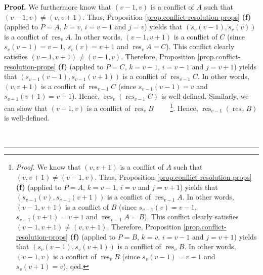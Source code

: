 \documentclass[numbers=enddot,12pt,final,onecolumn,notitlepage]{scrartcl}%
\theoremstyle{definition}
\newenvironment{proof}[1][Proof]{\noindent\textbf{#1.} }{\ \rule{0.5em}{0.5em}}
\newenvironment{verlong}{}{}
\begin{document}
\begin{verlong}
\begin{proof}
We furthermore know that $\left(  v-1,v\right)  $ is a conflict of $A$ such
that $\left(  v-1,v\right)  \neq\left(  v,v+1\right)  $. Thus, Proposition
\ref{prop.conflict-resolution-props} \textbf{(f)} (applied to $P=A$, $k=v$,
$i=v-1$ and $j=v$) yields that $\left(  s_{v}\left(  v-1\right)  ,s_{v}\left(
v\right)  \right)  $ is a conflict of $\operatorname*{res}\nolimits_{v}A$. In
other words, $\left(  v-1,v+1\right)  $ is a conflict of $C$ (since
$s_{v}\left(  v-1\right)  =v-1$, $s_{v}\left(  v\right)  =v+1$ and
$\operatorname*{res}\nolimits_{v}A=C$). This conflict clearly satisfies
$\left(  v-1,v+1\right)  \neq\left(  v-1,v\right)  $. Therefore, Proposition
\ref{prop.conflict-resolution-props} \textbf{(f)} (applied to $P=C$, $k=v-1$,
$i=v-1$ and $j=v+1$) yields that $\left(  s_{v-1}\left(  v-1\right)
,s_{v-1}\left(  v+1\right)  \right)  $ is a conflict of $\operatorname*{res}%
\nolimits_{v-1}C$. In other words, $\left(  v,v+1\right)  $ is a conflict of
$\operatorname*{res}\nolimits_{v-1}C$ (since $s_{v-1}\left(  v-1\right)  =v$
and $s_{v-1}\left(  v+1\right)  =v+1$). Hence, $\operatorname*{res}%
\nolimits_{v}\left(  \operatorname*{res}\nolimits_{v-1}C\right)  $ is
well-defined. Similarly, we can show that $\left(  v-1,v\right)  $ is a
conflict of $\operatorname*{res}\nolimits_{v}B$%
\ \ \ \ \footnote{\textit{Proof.} We know that $\left(  v,v+1\right)  $ is a
conflict of $A$ such that $\left(  v,v+1\right)  \neq\left(  v-1,v\right)  $.
Thus, Proposition \ref{prop.conflict-resolution-props} \textbf{(f)} (applied
to $P=A$, $k=v-1$, $i=v$ and $j=v+1$) yields that $\left(  s_{v-1}\left(
v\right)  ,s_{v-1}\left(  v+1\right)  \right)  $ is a conflict of
$\operatorname*{res}\nolimits_{v-1}A$. In other words, $\left(
v-1,v+1\right)  $ is a conflict of $B$ (since $s_{v-1}\left(  v\right)  =v-1$,
$s_{v-1}\left(  v+1\right)  =v+1$ and $\operatorname*{res}\nolimits_{v-1}%
A=B$). This conflict clearly satisfies $\left(  v-1,v+1\right)  \neq\left(
v,v+1\right)  $. Therefore, Proposition \ref{prop.conflict-resolution-props}
\textbf{(f)} (applied to $P=B$, $k=v$, $i=v-1$ and $j=v+1$) yields that
$\left(  s_{v}\left(  v-1\right)  ,s_{v}\left(  v+1\right)  \right)  $ is a
conflict of $\operatorname*{res}\nolimits_{v}B$. In other words, $\left(
v-1,v\right)  $ is a conflict of $\operatorname*{res}\nolimits_{v}B$ (since
$s_{v}\left(  v-1\right)  =v-1$ and $s_{v}\left(  v+1\right)  =v$), qed.}.
Hence, $\operatorname*{res}\nolimits_{v-1}\left(  \operatorname*{res}%
\nolimits_{v}B\right)  $ is well-defined.


\end{proof}
\end{verlong}
\end{document}
